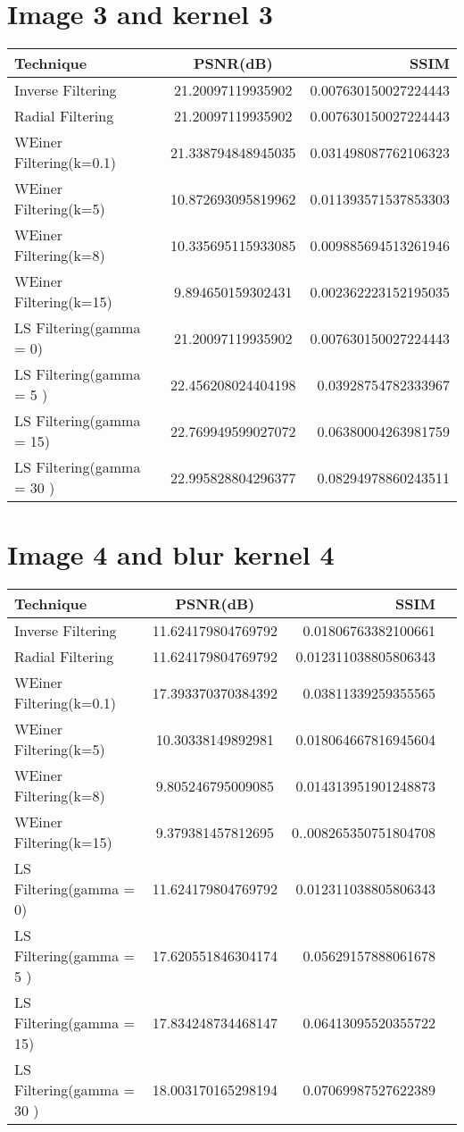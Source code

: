\documentclass{article}
\begin{document}
\section{Image 3 and kernel 3}
\begin{tabular}{|l|c|r|}
    \hline
    Technique & PSNR(dB) & SSIM\\
    \hline
    Inverse Filtering & 21.20097119935902 & 0.007630150027224443\\
    \hline
    Radial Filtering & 21.20097119935902 & 0.007630150027224443\\
    \hline
    WEiner Filtering(k=0.1) & 21.338794848945035 &  0.031498087762106323\\
    \hline
    WEiner Filtering(k=5) & 10.872693095819962 & 0.011393571537853303\\
    \hline
    WEiner Filtering(k=8) & 10.335695115933085 & 0.009885694513261946\\
    \hline
    WEiner Filtering(k=15) & 9.894650159302431 & 0.002362223152195035\\
    \hline
    LS Filtering(gamma = 0) & 21.20097119935902 & 0.007630150027224443\\
    \hline
    LS Filtering(gamma = 5 ) & 22.456208024404198 &  0.03928754782333967\\
    \hline
    LS Filtering(gamma = 15) &22.769949599027072 &  0.06380004263981759\\
    \hline
    LS Filtering(gamma = 30 ) & 22.995828804296377 & 0.08294978860243511\\
    \hline
\end{tabular}
\section{Image 4 and blur kernel 4}
\begin{tabular}{|l|c|r|p{8cm}}
    \hline
    Technique & PSNR(dB) & SSIM\\
    \hline
    Inverse Filtering & 11.624179804769792 & 0.01806763382100661\\
    \hline
    Radial Filtering & 11.624179804769792 &  0.012311038805806343\\
    \hline
    WEiner Filtering(k=0.1) & 17.393370370384392 &  0.03811339259355565\\
    \hline
    WEiner Filtering(k=5) & 10.30338149892981 & 0.018064667816945604\\
    \hline
    WEiner Filtering(k=8) & 9.805246795009085 & 0.014313951901248873\\
    \hline
    WEiner Filtering(k=15) & 9.379381457812695 & 0..008265350751804708\\
    \hline
    LS Filtering(gamma = 0) & 11.624179804769792 & 0.012311038805806343\\
    \hline
    LS Filtering(gamma = 5 ) & 17.620551846304174 & 0.05629157888061678\\
    \hline
    LS Filtering(gamma = 15) &17.834248734468147 &  0.06413095520355722\\
    \hline
    LS Filtering(gamma = 30 ) & 18.003170165298194 & 0.07069987527622389\\
    \hline
\end{tabular}
\end{document}
